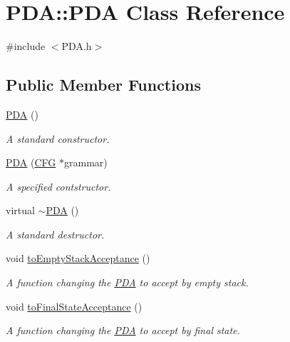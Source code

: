 \hypertarget{classPDA_1_1PDA}{\section{P\-D\-A\-:\-:P\-D\-A Class Reference}
\label{classPDA_1_1PDA}
}


{\ttfamily \#include $<$P\-D\-A.\-h$>$}

\subsection*{Public Member Functions}
\begin{DoxyCompactItemize}
\item 
\hyperlink{classPDA_1_1PDA_a7785c447944c57243e2b1ea76903e3f6}{P\-D\-A} ()
\begin{DoxyCompactList}\small\item\em A standard constructor. \end{DoxyCompactList}\item 
\hyperlink{classPDA_1_1PDA_a457ac4b1de0a21642e946847b85fcc2b}{P\-D\-A} (\hyperlink{classCFG}{C\-F\-G} $\ast$grammar)
\begin{DoxyCompactList}\small\item\em A specified contstructor. \end{DoxyCompactList}\item 
virtual \hyperlink{classPDA_1_1PDA_a9cd56fae8de9f1cc8a6b3da52d1b525f}{$\sim$\-P\-D\-A} ()
\begin{DoxyCompactList}\small\item\em A standard destructor. \end{DoxyCompactList}\item 
void \hyperlink{classPDA_1_1PDA_adeb9e042e871b40ad01630d4da2e7a6a}{to\-Empty\-Stack\-Acceptance} ()
\begin{DoxyCompactList}\small\item\em A function changing the \hyperlink{classPDA_1_1PDA}{P\-D\-A} to accept by empty stack. \end{DoxyCompactList}\item 
void \hyperlink{classPDA_1_1PDA_a6c6b86cde5edba8125fcf633d0a9a916}{to\-Final\-State\-Acceptance} ()
\begin{DoxyCompactList}\small\item\em A function changing the \hyperlink{classPDA_1_1PDA}{P\-D\-A} to accept by final state. \end{DoxyCompactList}\item 

\end{DoxyCompactItemize}
